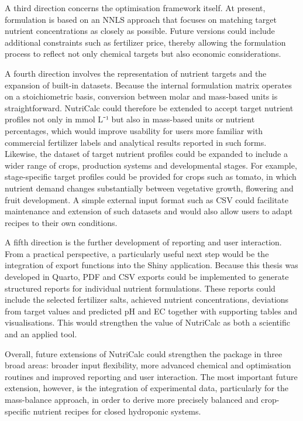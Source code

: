 \documentclass[
  letterpaper,
  DIV=11,
  numbers=noendperiod]{scrreprt}
\begin{document}
A third direction concerns the optimisation framework itself. At
present, formulation is based on an NNLS approach that focuses on
matching target nutrient concentrations as closely as possible. Future
versions could include additional constraints such as fertilizer price,
thereby allowing the formulation process to reflect not only chemical
targets but also economic considerations.

A fourth direction involves the representation of nutrient targets and
the expansion of built-in datasets. Because the internal formulation
matrix operates on a stoichiometric basis, conversion between molar and
mass-based units is straightforward. NutriCalc could therefore be
extended to accept target nutrient profiles not only in mmol L⁻¹ but
also in mass-based units or nutrient percentages, which would improve
usability for users more familiar with commercial fertilizer labels and
analytical results reported in such forms. Likewise, the dataset of
target nutrient profiles could be expanded to include a wider range of
crops, production systems and developmental stages. For example,
stage-specific target profiles could be provided for crops such as
tomato, in which nutrient demand changes substantially between
vegetative growth, flowering and fruit development. A simple external
input format such as CSV could facilitate maintenance and extension of
such datasets and would also allow users to adapt recipes to their own
conditions.

A fifth direction is the further development of reporting and user
interaction. From a practical perspective, a particularly useful next
step would be the integration of export functions into the Shiny
application. Because this thesis was developed in Quarto, PDF and CSV
exports could be implemented to generate structured reports for
individual nutrient formulations. These reports could include the
selected fertilizer salts, achieved nutrient concentrations, deviations
from target values and predicted pH and EC together with supporting
tables and visualisations. This would strengthen the value of NutriCalc
as both a scientific and an applied tool.

Overall, future extensions of NutriCalc could strengthen the package in
three broad areas: broader input flexibility, more advanced chemical and
optimisation routines and improved reporting and user interaction. The
most important future extension, however, is the integration of
experimental data, particularly for the mass-balance approach, in order
to derive more precisely balanced and crop-specific nutrient recipes for
closed hydroponic systems.
\end{document}
